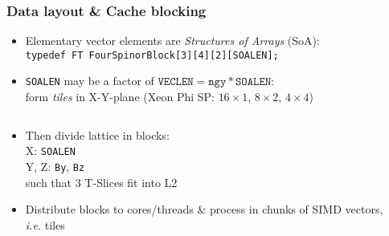 \documentclass{beamer}
\begin{document}
  \begin{frame}
    \frametitle{Data layout \& Cache blocking}

    \begin{itemize}
      \item Elementary vector elements are \textit{Structures of Arrays} (SoA):\\[2mm]
        \texttt{typedef FT FourSpinorBlock[3][4][2][SOALEN];}
        \vfill
      \item \texttt{SOALEN} may be a factor of $\texttt{VECLEN} = \texttt{ngy} * \texttt{SOALEN}$:\\[2mm]
        form \textit{tiles} in X-Y-plane (Xeon Phi SP: $16\times1$, $8\times2$, $4\times4$)
    \end{itemize}

    \vspace{-3mm}
    \begin{columns}[T]
      \begin{column}{.5\textwidth}
        \begin{center}
          \begin{itemize}
            \item Then divide lattice in blocks:\\[2mm]
              \; X: \;\texttt{SOALEN}\\
              \; Y, Z: \;\texttt{By}, \texttt{Bz}\\[2mm]
              such that 3 T-Slices fit into L2
              \vfill
              \vspace{3mm}
            \item Distribute blocks to cores/threads \& process in chunks
              of SIMD vectors, \textit{i.e.} tiles
              \vfill
          \end{itemize}
        \end{center}
      \end{column}
      \begin{column}{.5\textwidth}
        \begin{center}
\end{center}
\end{column}
\end{columns}
\end{frame}
\end{document}
